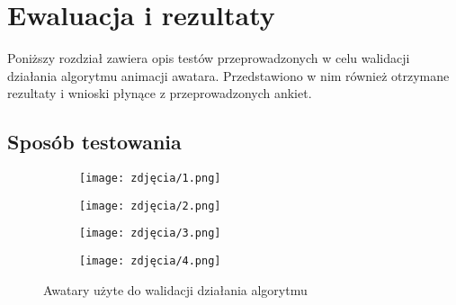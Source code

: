 \chapter{Ewaluacja i rezultaty}
\label{cha:ewaluacjaIRezultaty}
Poniższy rozdział zawiera opis testów przeprowadzonych w celu walidacji działania algorytmu animacji awatara. Przedstawiono w nim również otrzymane rezultaty i wnioski płynące z przeprowadzonych ankiet.

\section{Sposób testowania}
\begin{figure}[h]
	\centering
	\begin{subfigure}{0.35\textwidth}
		\centering
		\texttt{[image: zdjęcia/1.png]}
		\subcaption{\label{avatar_1}}
	\end{subfigure}
	\begin{subfigure}{0.35\textwidth}
		\centering
		\texttt{[image: zdjęcia/2.png]}
		\subcaption{\label{avatar_2}}
	\end{subfigure}
	\begin{subfigure}{0.35\textwidth}
		\centering
		\texttt{[image: zdjęcia/3.png]}
		\subcaption{\label{avatar_3}}
	\end{subfigure}
	\begin{subfigure}{0.35\textwidth}
		\centering
		\texttt{[image: zdjęcia/4.png]}
		\subcaption{\label{avatar_4}}
	\end{subfigure}
	
	\caption{\label{fig:avatars}Awatary użyte do walidacji działania algorytmu}
\end{figure}


